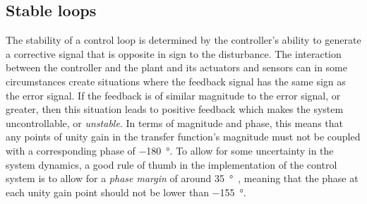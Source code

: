 \subsection{\label{sec:gain-phase-margin}Stable loops}
The stability of a control loop is determined by the controller's ability to generate a corrective signal that is opposite in sign to the disturbance. The interaction between the controller and the plant and its actuators and sensors can in some circumstances create situations where the feedback signal has the same sign as the error signal. If the feedback is of similar magnitude to the error signal, or greater, then this situation leads to positive feedback which makes the system uncontrollable, or \emph{unstable}. In terms of magnitude and phase, this means that any points of unity gain in the transfer function's magnitude must not be coupled with a corresponding phase of \SI{-180}{\degree}. To allow for some uncertainty in the system dynamics, a good rule of thumb in the implementation of the control system is to allow for a \emph{phase margin} of around \SI{35}{\degree}~\cite{Freise2003}, meaning that the phase at each unity gain point should not be lower than \SI{-155}{\degree}.